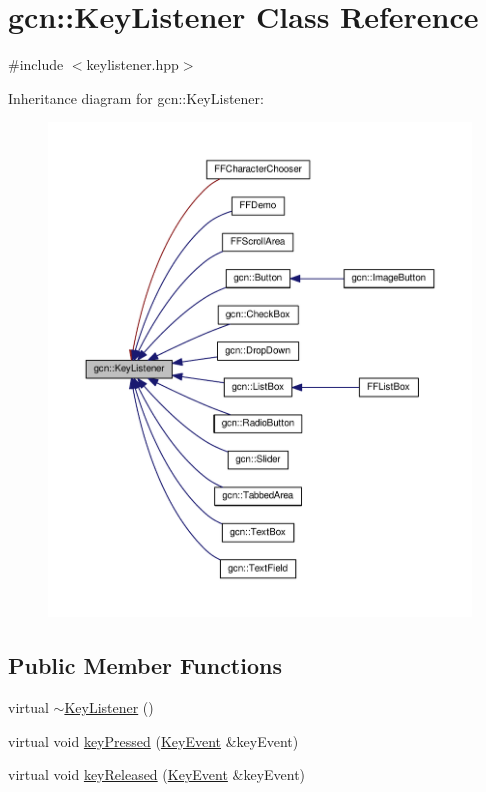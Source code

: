 \hypertarget{classgcn_1_1KeyListener}{}\section{gcn\+:\+:Key\+Listener Class Reference}
\label{classgcn_1_1KeyListener}


{\ttfamily \#include $<$keylistener.\+hpp$>$}



Inheritance diagram for gcn\+:\+:Key\+Listener\+:\nopagebreak
\begin{figure}[H]
\begin{center}
\leavevmode
\includegraphics[width=350pt]{classgcn_1_1KeyListener__inherit__graph}
\end{center}
\end{figure}
\subsection*{Public Member Functions}
\begin{DoxyCompactItemize}
\item 
virtual \hyperlink{classgcn_1_1KeyListener_a2799d25e1ce77a7cb4220ab101247f1d}{$\sim$\+Key\+Listener} ()
\item 
virtual void \hyperlink{classgcn_1_1KeyListener_ada6c0d038340d6ee674702268b2d2c67}{key\+Pressed} (\hyperlink{classgcn_1_1KeyEvent}{Key\+Event} \&key\+Event)
\item 
virtual void \hyperlink{classgcn_1_1KeyListener_a5cae3889ae71c19d3969b3b35bdf7f2e}{key\+Released} (\hyperlink{classgcn_1_1KeyEvent}{Key\+Event} \&key\+Event)
\end{DoxyCompactItemize}

